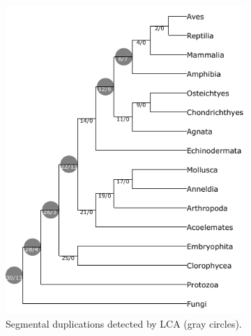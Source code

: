 \documentclass[10pt]{article}
\begin{document}
\begin{figure}[h!]
    \centering

    \begin{subfigure}[b]{0.48\textwidth}
        \centering
        \includegraphics[scale=0.7]{figs/guigo_lca.pdf} %
        \caption{Segmental duplications detected by LCA (gray circles).}
        \label{fig:guigo-lca}
    \end{subfigure}
    \hfill
    \begin{subfigure}[b]{0.48\textwidth}
        \centering

\end{subfigure}
\end{figure}
\end{document}
